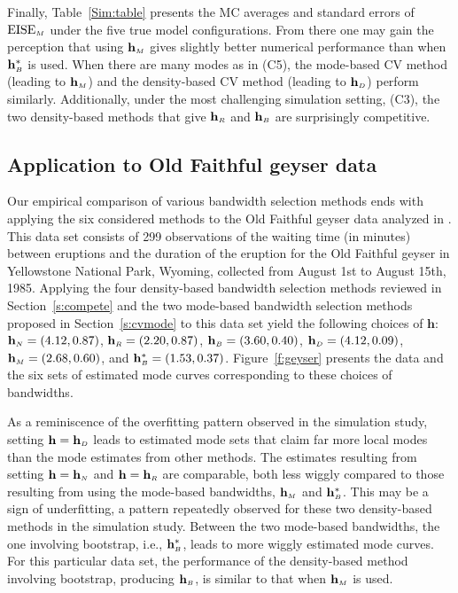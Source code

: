 \documentclass[fleqn,12pt,twoside]{article}
\newcommand{\bh}{\mathbf{h}}
\numberwithin{equation}{section}
\begin{document}
Finally, Table~\ref{Sim:table} presents the MC averages and standard errors of $\textrm{EISE}_{\hbox {\tiny $M$}}$ under the five true model configurations. From there one may gain the perception that using $\bh_{\hbox {\tiny $M$}}$ gives slightly better numerical performance than when $\bh^*_{\hbox {\tiny $B$}}$ is used. When there are many modes as in (C5), the mode-based CV method (leading to $\bh_{\hbox {\tiny $M$}}$) and the density-based CV method (leading to $\bh_{\hbox {\tiny $D$}}$) perform similarly. Additionally, under the most challenging simulation setting, (C3), the two density-based methods that give $\bh_{\hbox {\tiny $R$}}$ and $\bh_{\hbox {\tiny $B$}}$ are surprisingly competitive. 

\subsection{Application to Old Faithful geyser data}
Our empirical comparison of various bandwidth selection methods ends with applying the six considered methods to the Old Faithful geyser data analyzed in \cite{Bashtannyk.Hyndman2001}. This data set consists of 299 observations of the waiting time (in minutes) between eruptions and the duration of the eruption for the Old Faithful geyser in Yellowstone National Park, Wyoming, collected from August 1st to August 15th, 1985. 
Applying the four density-based bandwidth selection methods reviewed in Section~\ref{s:compete} and the two mode-based bandwidth selection methods proposed in Section~\ref{s:cvmode} to this data set yield the following choices of $\bh$: $\bh_{\hbox {\tiny $N$}}=(4.12, 0.87)$, $\bh_{\hbox {\tiny $R$}}=(2.20, 0.87)$, $\bh_{\hbox {\tiny $B$}}=(3.60, 0.40)$, $\bh_{\hbox {\tiny $D$}}=(4.12, 0.09)$, $\bh_{\hbox {\tiny $M$}}=(2.68, 0.60)$, and $\bh^*_{\hbox {\tiny $B$}}=(1.53, 0.37)$. Figure~\ref{f:geyser} presents the data and the six sets of estimated mode curves corresponding to these choices of bandwidths.

As a reminiscence of the overfitting pattern observed in the simulation study, setting $\bh=\bh_{\hbox {\tiny $D$}}$ leads to estimated mode sets that claim far more local modes than the mode estimates from other methods. The estimates resulting from setting $\bh=\bh_{\hbox {\tiny $N$}}$ and  $\bh=\bh_{\hbox {\tiny $R$}}$ are comparable, both less wiggly compared to those resulting from using the mode-based bandwidths,  $\bh_{\hbox {\tiny $M$}}$ and  $\bh^*_{\hbox {\tiny $B$}}$. This may be a sign of underfitting, a pattern repeatedly observed for these two density-based methods in the simulation study. Between the two mode-based bandwidths, the one involving bootstrap, i.e.,  $\bh^*_{\hbox {\tiny $B$}}$, leads to more wiggly estimated mode curves. For this particular data set, the performance of the density-based method involving bootstrap, producing $\bh_{\hbox {\tiny $B$}}$, is similar to that when $\bh_{\hbox {\tiny $M$}}$ is used. 
\end{document}
